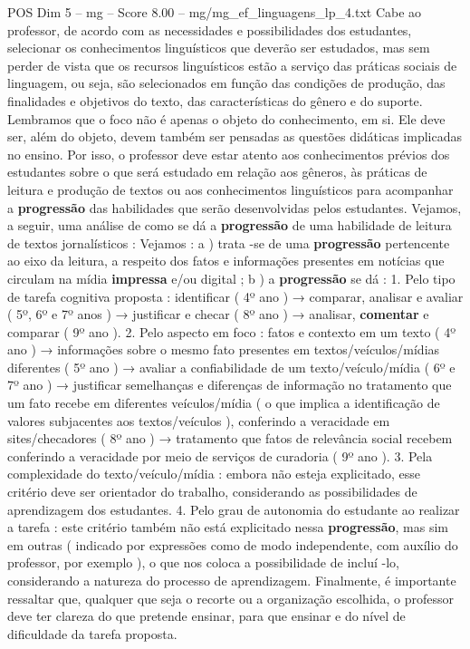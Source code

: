 \begin{textsample}{POS Dim 5 – mg – Score 8.00 – mg/mg\_ef\_linguagens\_lp\_4.txt}
Cabe ao professor, de acordo com as necessidades e possibilidades dos estudantes, selecionar os conhecimentos linguísticos que deverão ser estudados, mas sem perder de vista que os recursos linguísticos estão a serviço das práticas sociais de linguagem, ou seja, são selecionados em função das condições de produção, das finalidades e objetivos do texto, das características do gênero e do suporte.
Lembramos que o foco não é apenas o objeto do conhecimento, em si.
Ele deve ser, além do objeto, devem também ser pensadas as questões didáticas implicadas no ensino.
Por isso, o professor deve estar atento aos conhecimentos prévios dos estudantes sobre o que será estudado em relação aos gêneros, às práticas de leitura e produção de textos ou aos conhecimentos linguísticos para acompanhar a \textbf{progressão} das habilidades que serão desenvolvidas pelos estudantes.
Vejamos, a seguir, uma análise de como se dá a \textbf{progressão} de uma habilidade de leitura de textos jornalísticos : Vejamos : a ) trata -se de uma \textbf{progressão} pertencente ao eixo da leitura, a respeito dos fatos e informações presentes em notícias que circulam na mídia \textbf{impressa} e/ou digital ; b ) a \textbf{progressão} se dá : 1.
Pelo tipo de tarefa cognitiva proposta : identificar ( 4º ano ) → comparar, analisar e avaliar ( 5º, 6º e 7º anos ) → justificar e checar ( 8º ano ) → analisar, \textbf{comentar} e comparar ( 9º ano ). 2.
Pelo aspecto em foco : fatos e contexto em um texto ( 4º ano ) → informações sobre o mesmo fato presentes em textos/veículos/mídias diferentes ( 5º ano ) → avaliar a confiabilidade de um texto/veículo/mídia ( 6º e 7º ano ) → justificar semelhanças e diferenças de informação no tratamento que um fato recebe em diferentes veículos/mídia ( o que implica a identificação de valores subjacentes aos textos/veículos ), conferindo a veracidade em sites/checadores ( 8º ano ) → tratamento que fatos de relevância social recebem conferindo a veracidade por meio de serviços de curadoria ( 9º ano ). 3.
Pela complexidade do texto/veículo/mídia : embora não esteja explicitado, esse critério deve ser orientador do trabalho, considerando as possibilidades de aprendizagem dos estudantes. 4.
Pelo grau de autonomia do estudante ao realizar a tarefa : este critério também não está explicitado nessa \textbf{progressão}, mas sim em outras ( indicado por expressões como de modo independente, com auxílio do professor, por exemplo ), o que nos coloca a possibilidade de incluí -lo, considerando a natureza do processo de aprendizagem.
Finalmente, é importante ressaltar que, qualquer que seja o recorte ou a organização escolhida, o professor deve ter clareza do que pretende ensinar, para que ensinar e do nível de dificuldade da tarefa proposta.

\end{textsample}
